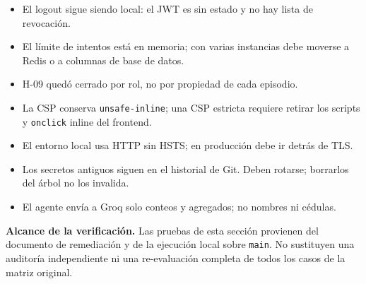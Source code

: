 \begin{itemize}
  \item El logout sigue siendo local: el JWT es sin estado y no hay lista de
  revocación.
  \item El límite de intentos está en memoria; con varias instancias debe moverse
  a Redis o a columnas de base de datos.
  \item H-09 quedó cerrado por rol, no por propiedad de cada episodio.
  \item La CSP conserva \texttt{unsafe-inline}; una CSP estricta requiere retirar
  los scripts y \texttt{onclick} inline del frontend.
  \item El entorno local usa HTTP sin HSTS; en producción debe ir detrás de TLS.
  \item Los secretos antiguos siguen en el historial de Git. Deben rotarse; borrarlos
  del árbol no los invalida.
  \item El agente envía a Groq solo conteos y agregados; no nombres ni cédulas.
\end{itemize}

\noindent\footnotesize
\textbf{Alcance de la verificación.} Las pruebas de esta sección provienen del
documento de remediación y de la ejecución local sobre \texttt{main}. No
sustituyen una auditoría independiente ni una re-evaluación completa de todos los
casos de la matriz original.
\normalsize
